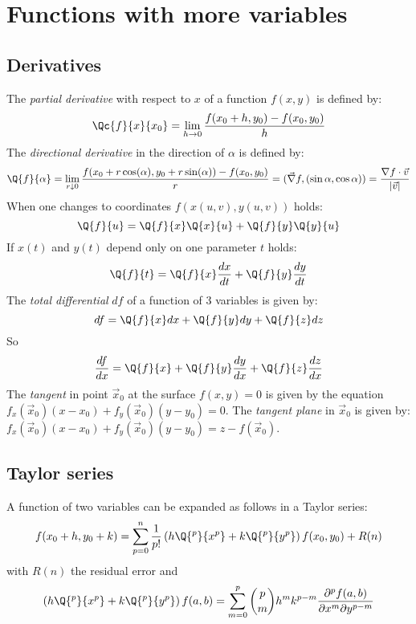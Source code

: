 \section{Functions with more variables}
\subsection{Derivatives}
The {\it partial derivative} with respect to $x$ of a function $f(x,y)$ is defined by:
\[
\Qc{f}{x}{x_0}=\lim_{h\rightarrow0}\frac{f(x_0+h,y_0)-f(x_0,y_0)}{h}
\]
The {\it directional derivative} in the direction of $\alpha$ is defined by:
\[
\Q{f}{\alpha}=\lim_{r\downarrow0}\frac{f(x_0+r\cos(\alpha),y_0+r\sin(\alpha))-f(x_0,y_0)}{r}=
(\vec{\nabla}f,(\sin\alpha,\cos\alpha))=\frac{\nabla f\cdot\vec{v}}{|\vec{v}|}
\]
When one changes to coordinates $f(x(u,v),y(u,v))$ holds:
\[
\Q{f}{u}=\Q{f}{x}\Q{x}{u}+\Q{f}{y}\Q{y}{u}
\]
If $x(t)$ and $y(t)$ depend only on one parameter $t$ holds:
\[
\Q{f}{t}=\Q{f}{x}\frac{dx}{dt}+\Q{f}{y}\frac{dy}{dt}
\]
The {\it total differential} $df$ of a function of 3 variables is given by:
\[
df=\Q{f}{x}dx+\Q{f}{y}dy+\Q{f}{z}dz
\]
So
\[
\frac{df}{dx}=\Q{f}{x}+\Q{f}{y}\frac{dy}{dx}+\Q{f}{z}\frac{dz}{dx}
\]
The {\it tangent} in point $\vec{x}_0$ at the surface $f(x,y)=0$ is given by
the equation $f_x(\vec{x}_0)(x-x_0)+f_y(\vec{x}_0)(y-y_0)=0$.
\npar
The {\it tangent plane} in $\vec{x}_0$ is given by:
$f_x(\vec{x}_0)(x-x_0)+f_y(\vec{x}_0)(y-y_0)=z-f(\vec{x}_0)$.

\subsection{Taylor series}
A function of two variables can be expanded as follows in a Taylor series:
\[
f(x_0+h,y_0+k)=\sum\limits_{p=0}^n \frac{1}{p!}
\left(h\Q{^p}{x^p}+k\Q{^p}{y^p}\right)f(x_0,y_0)+R(n)
\]
with $R(n)$ the residual error and
\[
\left(h\Q{^p}{x^p}+k\Q{^p}{y^p}\right)f(a,b)=\sum\limits_{m=0}^p{p\choose m}
h^mk^{p-m}\frac{\partial^pf(a,b)}{\partial x^m\partial y^{p-m}}
\]

